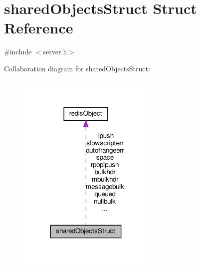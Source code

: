 \hypertarget{structshared_objects_struct}{}\section{shared\+Objects\+Struct Struct Reference}
\label{structshared_objects_struct}


{\ttfamily \#include $<$server.\+h$>$}



Collaboration diagram for shared\+Objects\+Struct\+:
\nopagebreak
\begin{figure}[H]
\begin{center}
\leavevmode
\includegraphics[width=191pt]{structshared_objects_struct__coll__graph}
\end{center}
\end{figure}
